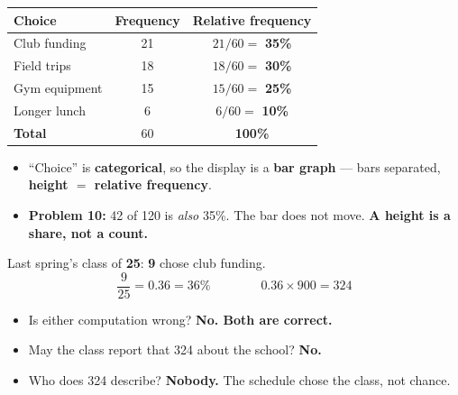 \documentclass[aspectratio=169, 11pt]{beamer}
\newcommand{\redink}[1]{{\color{redacc}\bfseries #1}}
\begin{document}
\begin{frame}[t, plain]
  \vspace{2pt}
  \begin{center}
    \small
    \renewcommand{\arraystretch}{1.25}
    \begin{tabular}{@{} l c c @{}}
    \hline
    \textbf{Choice} & \textbf{Frequency} & \textbf{Relative frequency} \\
    \hline
    Club funding  & 21 & $21/60 =$ \redink{35\%} \\
    Field trips   & 18 & $18/60 =$ \redink{30\%} \\
    Gym equipment & 15 & $15/60 =$ \redink{25\%} \\
    Longer lunch  & \phantom{0}6 & $6/60 =$ \redink{10\%} \\
    \hline
    \textbf{Total} & 60 & \redink{100\%} \\
    \hline
    \end{tabular}
  \end{center}
  \vspace{6pt}
  \begin{itemize}\setlength{\itemsep}{4pt}
    \item ``Choice'' is \textbf{categorical}, so the display is a \textbf{bar graph} --- bars
          separated, \textbf{height $=$ relative frequency}.
    \item \textbf{Problem 10:} 42 of 120 is \emph{also} 35\%. The bar does not move. \redink{A
          height is a share, not a count.}
  \end{itemize}
\end{frame}

\begin{frame}[t, plain]
  \vspace{4pt}
  \begin{center}
    \begin{minipage}{0.86\textwidth}
      Last spring's class of \textbf{25}: \textbf{9} chose club funding.
      \[ \frac{9}{25} = 0.36 = 36\% \qquad\qquad 0.36 \times 900 = 324 \]
    \end{minipage}
  \end{center}
  \vspace{4pt}
  \begin{itemize}\setlength{\itemsep}{5pt}
    \item Is either computation wrong? \redink{No. Both are correct.}
    \item May the class report that 324 about the school? \redink{No.}
    \item Who does 324 describe? \redink{Nobody.} The schedule chose the class, not chance.
  \end{itemize}
\end{frame}
\end{document}
